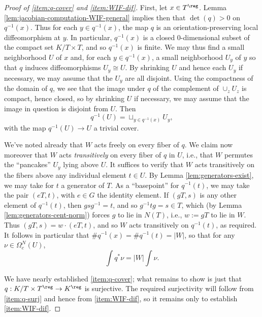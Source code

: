 \documentclass[reqno]{amsart} 
\begin{document}
\begin{proof}
[Proof of \ref{item:q-cover} and \ref{item:WIF-dif}]
  First, let $x \in T^{\reg}$.  Lemma \ref{lem:jacobian-computation-WIF-general} implies then that $\det(q) > 0$ on $q^{-1}(x)$.  Thus for each $y \in q^{-1}(x)$, the map $q$ is an orientation-preserving local diffeomorphism at $y$.  In particular, $q^{-1}(x)$ is a closed $0$-dimensional subset of the compact set $K/T \times T$, and so $q^{-1}(x)$ is finite.  We may thus find a small neighborhood $U$ of $x$ and, for each $y \in q^{-1}(x)$, a small neighborhood $U_y$ of $y$ so that $q$ induces diffeomorphisms $U_y \cong U$.  By shrinking $U$ and hence each $U_y$ if necessary, we may assume that the $U_y$ are all disjoint.  Using the compactness of the domain of $q$, we see that the image under $q$ of the complement of $\cup_z U_z$ is compact, hence closed, so by shrinking $U$ if necessary, we may assume that the image in question is disjoint from $U$.  Then
  \begin{equation}\label{eq:}
    q^{-1}(U) = \sqcup_{y \in q^{-1}(x)} U_y,
  \end{equation}
  with the map $q^{-1}(U) \rightarrow U$ a trivial cover.

  We've noted already that $W$ acts freely on every fiber of $q$.  We claim now moreover that $W$ acts \emph{transitively} on every fiber of $q$ in $U$, i.e., that $W$ permutes the ``pancakes'' $U_y$ lying above $U$.  It suffices to verify that $W$ acts transitively on the fibers above any individual element $t \in U$.  By Lemma \ref{lem:generators-exist}, we may take for $t$ a generator of $T$.  As a ``basepoint'' for $q^{-1}(t)$, we may take the pair $(e T,t)$, with $e \in G$ the identity element.  If $(g T,s)$ is any other element of $q^{-1}(t)$, then $g s g^{-1} = t$, and so $g^{-1} t g = s \in T$, which (by Lemma \ref{lem:generators-cent-norm}) forces $g$ to lie in $N(T)$, i.e., $w := g T$ to lie in $W$.  Thus $(g T, s) = w \cdot (e T, t)$, and so $W$ acts transitively on $q^{-1}(t)$, as required.  It follows in particular that $\# q^{-1} (x) =\# q^{-1}(t) = |W|$, so that for any $\nu \in \Omega_c^N(U)$,
  \begin{equation}\label{eq:partial-WIF-good-U}
    \int q^* \nu = |W| \int \nu.
  \end{equation}

  We have nearly established \ref{item:q-cover}; what remains to show is just that $q : K/T \times T^{\reg} \rightarrow K^{\reg}$ is surjective.  The required surjectivity will follow from \ref{item:q-surj} and hence from \ref{item:WIF-dif}, so it remains only to establish \ref{item:WIF-dif}.
  

\end{proof}
\end{document}
